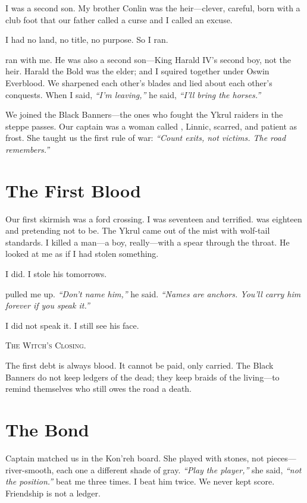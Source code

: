 \documentclass[11pt,a5paper]{book}
\newenvironment{witchclosing}
  {\begin{quoting}[font={small\itshape}, leftmargin=2em, rightmargin=2em]\noindent\textsc{The Witch's Closing.}\par}
  {\end{quoting}}
\begin{document}
\epigraph{I was a second son. My brother Conlin was the heir---clever, careful, born with a club foot that our father called a curse and I called an excuse.}{\braedon}

\lettrine{I}{} had no land, no title, no purpose. So I ran.

\baldvyn{} ran with me. He was also a second son---King Harald IV's second boy, not the heir. Harald the Bold was the elder; \baldvyn{} and I squired together under Oswin Everblood. We sharpened each other's blades and lied about each other's conquests. When I said, \textit{``I'm leaving,''} he said, \textit{``I'll bring the horses.''}

We joined the Black Banners---the ones who fought the Ykrul raiders in the steppe passes. Our captain was a woman called \soren{}, Linnic, scarred, and patient as frost. She taught us the first rule of war: \textit{``Count exits, not victims. The road remembers.''}

\section*{The First Blood}
Our first skirmish was a ford crossing. I was seventeen and terrified. \baldvyn{} was eighteen and pretending not to be. The Ykrul came out of the mist with wolf-tail standards. I killed a man---a boy, really---with a spear through the throat. He looked at me as if I had stolen something.

I did. I stole his tomorrows.

\baldvyn{} pulled me up. \textit{``Don't name him,''} he said. \textit{``Names are anchors. You'll carry him forever if you speak it.''}

I did not speak it. I still see his face.

\begin{witchclosing}
The first debt is always blood. It cannot be paid, only carried. The Black Banners do not keep ledgers of the dead; they keep braids of the living---to remind themselves who still owes the road a death.
\end{witchclosing}

\section*{The Bond}
Captain \soren{} matched us in the Kon'reh board. She played with stones, not pieces---river-smooth, each one a different shade of gray. \textit{``Play the player,''} she said, \textit{``not the position.''} \baldvyn{} beat me three times. I beat him twice. We never kept score. Friendship is not a ledger.
\end{document}
